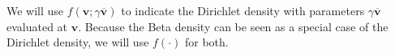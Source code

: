 \documentclass[11pt,a4paper]{article}
\begin{document}

We will use $f(\mathbf{v}; \gamma \overline{\mathbf{v}})$ to indicate the Dirichlet density with parameters $\gamma \overline{\mathbf{v}}$ evaluated at $\mathbf{v}$. Because the Beta density can be seen as a special case of the Dirichlet density, we will use $f(\cdot)$ for both.\\  %
\end{document}
